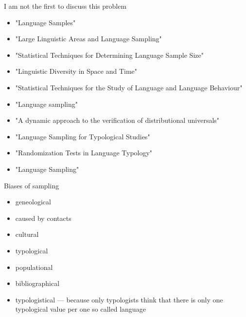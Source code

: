 \documentclass[13pt, t]{beamer}
\begin{document}
\begin{frame}{I am not the first to discuss this problem}
\begin{itemize}
\item \citep{bell78} "Language Samples"
\item \citep{dryer89} "Large Linguistic Areas and Language Sampling"
\item \citep{perkins89} "Statistical Techniques for Determining Language Sample Size"
\item \citep{nichols92} "Linguistic Diversity in Space and Time"
\item \citep{rietveld93} "Statistical Techniques for the Study of Language and Language Behaviour"
\item \citep{rijkhoff98} "Language sampling"
\item \citep{maslova00} "A dynamic approach to the verification of distributional universals"
\item \citep{widmann01} "Language Sampling for Typological Studies"
\item \citep{janssen06} "Randomization Tests in Language Typology"
\item \citep{bakker10} "Language Sampling"
\end{itemize}
\end{frame}

\begin{frame}{Biases of sampling}
\begin{itemize}
\item geneological
\item caused by contacts
\item cultural
\item typological
\item populational \pause
\item \Large \alert{bibliographical} \pause
\item \LARGE \alert{typologistical} --- because only typologists think that there is only one typological value per one so called language
\end{itemize}
\end{frame}
\end{document}
